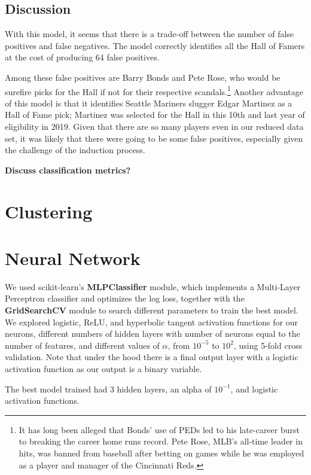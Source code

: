 \documentclass{sigkddExp}
\begin{document}
\subsection{Discussion}
With this model, it seems that there is a trade-off between the number of false positives and false negatives. The model correctly identifies all the Hall of Famers at the cost of producing 64 false positives.

Among these false positives are Barry Bonds and Pete Rose, who would be surefire picks for the Hall if not for their respective scandals.\footnote{It has long been alleged that Bonds' use of PEDs led to his late-career burst to breaking the career home runs record. Pete Rose, MLB's all-time leader in hits, was banned from baseball after betting on games while he was employed as a player and manager of the Cincinnati Reds.} Another advantage of this model is that it identifies Seattle Mariners slugger Edgar Martinez as a Hall of Fame pick; Martinez was selected for the Hall in this 10th and last year of eligibility in 2019. Given that there are so many players even in our reduced data set, it was likely that there were going to be some false positives, especially given the challenge of the induction process.

\textbf{Discuss classification metrics?}

\section{Clustering}

\section{Neural Network}
We used scikit-learn's \textbf{MLPClassifier} module, which implements a Multi-Layer Perceptron classifier and optimizes the log loss, together with the \textbf{GridSearchCV} module to search different parameters to train the best model. We explored logistic, ReLU, and hyperbolic tangent activation functions for our neurons, different numbers of hidden layers with number of neurons equal to the number of features, and different values of $\alpha$, from $10^{-5}$ to $10^2$, using 5-fold cross validation. Note that under the hood there is a final output layer with a logistic activation function as our output is a binary variable.

The best model trained had 3 hidden layers, an alpha of $10^{-1}$, and logistic activation functions.
\end{document}
